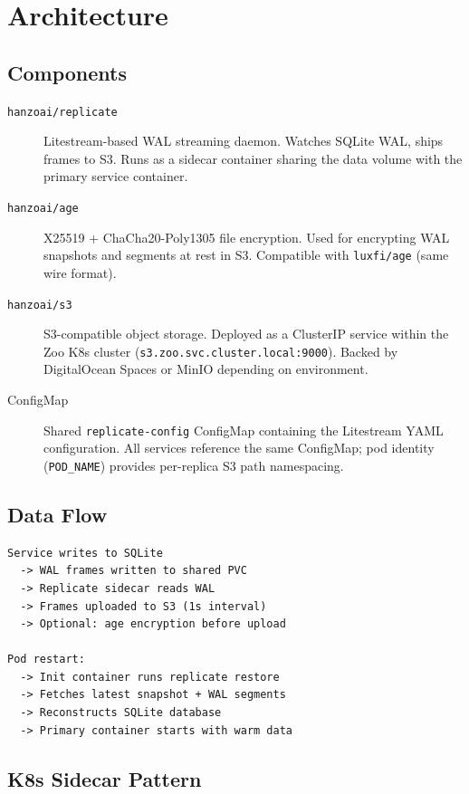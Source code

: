 \documentclass[twocolumn,11pt]{article}
\begin{document}
\section{Architecture}

\subsection{Components}

\begin{description}
\item[\texttt{hanzoai/replicate}] Litestream-based WAL streaming
  daemon.  Watches SQLite WAL, ships frames to S3.  Runs as a
  sidecar container sharing the data volume with the primary
  service container.

\item[\texttt{hanzoai/age}] X25519 + ChaCha20-Poly1305 file
  encryption.  Used for encrypting WAL snapshots and segments
  at rest in S3.  Compatible with \texttt{luxfi/age} (same
  wire format).

\item[\texttt{hanzoai/s3}] S3-compatible object storage.  Deployed
  as a ClusterIP service within the Zoo K8s cluster
  (\texttt{s3.zoo.svc.cluster.local:9000}).  Backed by
  DigitalOcean Spaces or MinIO depending on environment.

\item[ConfigMap] Shared \texttt{replicate-config} ConfigMap
  containing the Litestream YAML configuration.  All services
  reference the same ConfigMap; pod identity (\texttt{POD\_NAME})
  provides per-replica S3 path namespacing.
\end{description}

\subsection{Data Flow}

\begin{verbatim}
Service writes to SQLite
  -> WAL frames written to shared PVC
  -> Replicate sidecar reads WAL
  -> Frames uploaded to S3 (1s interval)
  -> Optional: age encryption before upload

Pod restart:
  -> Init container runs replicate restore
  -> Fetches latest snapshot + WAL segments
  -> Reconstructs SQLite database
  -> Primary container starts with warm data
\end{verbatim}

\subsection{K8s Sidecar Pattern}
\end{document}
